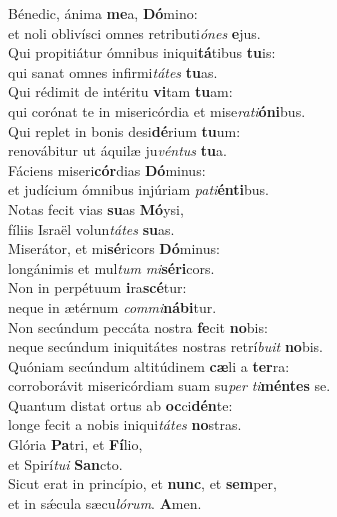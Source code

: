 \evenverse Bénedic, ánima \textbf{me}a, \textbf{Dó}mino:~\*\\
\evenverse et noli oblivísci omnes retributi\textit{ó}\textit{nes} \textbf{e}jus.\\
\oddverse Qui propitiátur ómnibus iniqui\textbf{tá}tibus \textbf{tu}is:~\*\\
\oddverse qui sanat omnes infirmi\textit{tá}\textit{tes} \textbf{tu}as.\\
\evenverse Qui rédimit de intéritu \textbf{vi}tam \textbf{tu}am:~\*\\
\evenverse qui corónat te in misericórdia et mise\textit{ra}\textit{ti}\textbf{ó}\textbf{ni}bus.\\
\oddverse Qui replet in bonis desi\textbf{dé}rium \textbf{tu}um:~\*\\
\oddverse renovábitur ut áquilæ ju\textit{vén}\textit{tus} \textbf{tu}a.\\
\evenverse Fáciens miseri\textbf{cór}dias \textbf{Dó}minus:~\*\\
\evenverse et judícium ómnibus injúriam \textit{pa}\textit{ti}\textbf{én}\textbf{ti}bus.\\
\oddverse Notas fecit vias \textbf{su}as \textbf{Mó}ysi,~\*\\
\oddverse fíliis Israël volun\textit{tá}\textit{tes} \textbf{su}as.\\
\evenverse Miserátor, et mi\textbf{sé}ricors \textbf{Dó}minus:~\*\\
\evenverse longánimis et mul\textit{tum} \textit{mi}\textbf{sé}\textbf{ri}cors.\\
\oddverse Non in perpétuum \textbf{i}ra\textbf{scé}tur:~\*\\
\oddverse neque in ætérnum \textit{com}\textit{mi}\textbf{ná}\textbf{bi}tur.\\
\evenverse Non secúndum peccáta nostra \textbf{fe}cit \textbf{no}bis:~\*\\
\evenverse neque secúndum iniquitátes nostras retrí\textit{bu}\textit{it} \textbf{no}bis.\\
\oddverse Quóniam secúndum altitúdinem \textbf{cæ}li a \textbf{ter}ra:~\*\\
\oddverse corroborávit misericórdiam suam su\textit{per} \textit{ti}\textbf{mén}\textbf{tes} se.\\
\evenverse Quantum distat ortus ab \textbf{oc}ci\textbf{dén}te:~\*\\
\evenverse longe fecit a nobis iniqui\textit{tá}\textit{tes} \textbf{no}stras.\\
\oddverse Glória \textbf{Pa}tri, et \textbf{Fí}lio,~\*\\
\oddverse et Spirí\textit{tu}\textit{i} \textbf{San}cto.\\
\evenverse Sicut erat in princípio, et \textbf{nunc}, et \textbf{sem}per,~\*\\
\evenverse et in sǽcula sæcu\textit{ló}\textit{rum}. \textbf{A}men.\\
